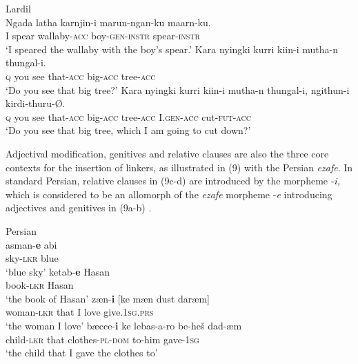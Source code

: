 \documentclass[output=paper]{langsci/langscibook}
\begin{document}
\ea%
    Lardil  \citep[47]{Richards2013}\label{ex:manzini:8}\\
    \ea
    \gll Ngada latha   karnjin-i   marun-ngan-ku   maarn-ku.     \\
         I   spear   wallaby-\textsc{acc} boy-\textsc{gen-instr}  spear-\textsc{instr} \\
    \glt ‘I speared the wallaby with the boy’s spear.’
    \ex
    \gll Kara   nyingki   kurri   kiin-i     mutha-n   thungal-i. \\
         \textsc{q}    you     see   that-\textsc{acc}    big-\textsc{acc}    tree\textsc{{}-acc} \\
    \glt ‘Do you see that big tree?’
    \ex
    \gll Kara   nyingki kurri kiin-i     mutha-n thungal-i,   ngithun-i kirdi-thuru-Ø. \\
         \textsc{q}  you     see   that-\textsc{acc}    big-\textsc{acc}   tree-\textsc{acc}    I.\textsc{gen-acc}  cut-\textsc{fut-acc} \\
    \glt ‘Do you see that big tree, which I am going to cut down?’
    \z
\z

Adjectival modification, genitives and relative clauses are also the three core contexts for the insertion of linkers, as illustrated in (9) with the Persian \textit{ezafe}. In standard Persian, relative clauses in (9c-d) are introduced by the morpheme -\textit{i,} which is considered to be an allomorph of the \textit{ezafe} morpheme -\textit{e} introducing adjectives and genitives in (9a-b) \citep{Samvelian2007}.

\ea%
    Persian\label{ex:manzini:9}\\
    \ea
    \gll asman-\textbf{e}   abi     \\
         sky-\textsc{lkr}    blue\\
    \glt ‘blue sky’        
    \ex  
    \gll ketab-\textbf{e}   Hasan   \\
         book-\textsc{lkr}    Hasan\\
    \glt ‘the book of Hasan’ 
    \ex  
    \gll zæn-\textbf{i}     [ke  mæn  dust  daræm]\\
         woman-\textsc{lkr}   that   I   love  give.\textsc{1sg.prs}\\
    \glt ‘the woman I love’
    \ex
    \gll bæcce-\textbf{i}   ke   lebas-a-ro     be-heš dad-æm\\
         child-\textsc{lkr}    that   clothes-\textsc{pl-dom}    to-him gave-\textsc{1sg} \\
    \glt ‘the child that I gave the clothes to’
    \z
\z
\end{document}
